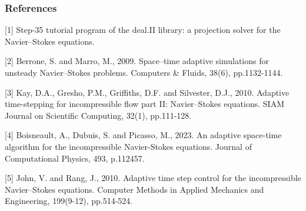\documentclass{settings/laserbeam}
\begin{document}
\begin{frame}

    \frametitle{References}

	{\fontsize{8pt}{7.2}\selectfont

    [1] Step-35 tutorial program of the deal.II library: a projection solver for the Navier–Stokes equations.\\
    \vspace{1em}

    [2] Berrone, S. and Marro, M., 2009. Space–time adaptive simulations for unsteady Navier–Stokes problems. Computers & Fluids, 38(6), pp.1132-1144.\\
    \vspace{1em}

    [3] Kay, D.A., Gresho, P.M., Griffiths, D.F. and Silvester, D.J., 2010. Adaptive time-stepping for incompressible flow part II: Navier–Stokes equations. SIAM Journal on Scientific Computing, 32(1), pp.111-128.\\
    \vspace{1em}

    [4] Boisneault, A., Dubuis, S. and Picasso, M., 2023. An adaptive space-time algorithm for the incompressible Navier-Stokes equations. Journal of Computational Physics, 493, p.112457.\\
    \vspace{1em}

    [5] John, V. and Rang, J., 2010. Adaptive time step control for the incompressible Navier–Stokes equations. Computer Methods in Applied Mechanics and Engineering, 199(9-12), pp.514-524.\\
	}

\end{frame}
\end{document}
